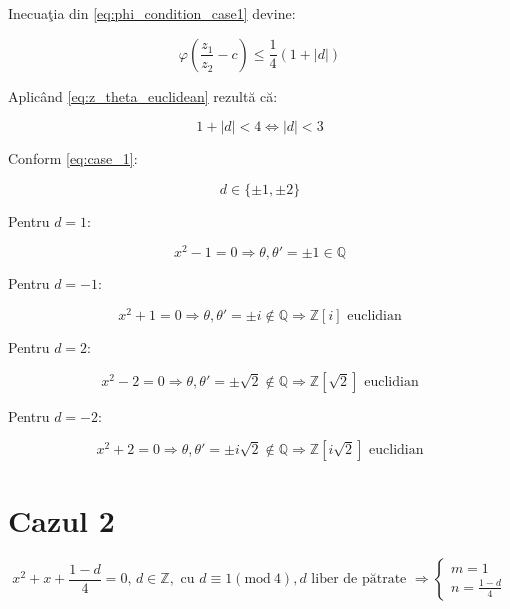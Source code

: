 \documentclass[12pt]{article}
\begin{document}
Inecuaţia din \eqref{eq:phi_condition_case1} devine:

\begin{equation}
    \varphi \left(\frac{z_1}{z_2} - c\right) \leq \frac{1}{4}(1 + |d|)
\end{equation}

Aplicând \eqref{eq:z_theta_euclidean} rezultă că:

\begin{equation}
    1 + |d| < 4 \Leftrightarrow |d| < 3
\end{equation}

Conform \eqref{eq:case_1}:

\begin{equation*}
    d \in \{\pm 1, \pm 2\}
\end{equation*}

Pentru $d = 1$:

\begin{equation*}
    x^2 - 1 = 0 \Rightarrow \theta, \theta' = \pm 1 \in \mathbb{Q}
\end{equation*}

Pentru $d = -1$:

\begin{equation}
    x^2 + 1 = 0 \Rightarrow \theta, \theta' = \pm i \notin \mathbb{Q} \Rightarrow \boxed{\mathbb{Z}[i] \text{ euclidian}}
\end{equation}

Pentru $d = 2$:

\begin{equation}
    x^2 - 2 = 0 \Rightarrow \theta, \theta' = \pm \sqrt{2} \notin \mathbb{Q} \Rightarrow \boxed{\mathbb{Z}[\sqrt{2}] \text{ euclidian}}
\end{equation}

Pentru $d = -2$:

\begin{equation}
    x^2 + 2 = 0 \Rightarrow \theta, \theta' = \pm i\sqrt{2} \notin \mathbb{Q} \Rightarrow \boxed{\mathbb{Z}[i\sqrt{2}] \text{ euclidian}}
\end{equation}

\section*{Cazul 2} 
\begin{equation} \label{eq:case_2}
x^2 + x + \frac{1 - d}{4} = 0, \, d \in \mathbb{Z},
\text{ cu } d \equiv 1 (\text{mod}\ 4), d \text{ liber de pătrate }
\Rightarrow \begin{cases} m = 1 \\ n = \frac{1-d}{4} \end{cases}
\end{equation}
\end{document}
